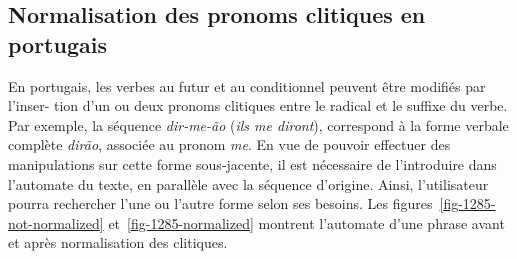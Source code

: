 \subsection{Normalisation des pronoms clitiques en portugais}
\label{section-portuguese-clitics}
En portugais, les verbes au futur et au conditionnel peuvent être modifiés par l’inser-
tion d’un ou deux pronoms clitiques entre le radical et le suffixe du verbe. Par exemple, la
séquence \textit{dir-me-ão} (\textit{ils me diront}), correspond à la forme verbale complète 
\textit{dirão}, associée au pronom \textit{me}. En vue de pouvoir effectuer des manipulations
sur cette forme sous-jacente, il est nécessaire de l’introduire dans l’automate du texte, en parallèle
avec la séquence d’origine. Ainsi, l’utilisateur pourra rechercher l’une ou l’autre forme selon ses besoins. 
Les figures~\ref{fig-1285-not-normalized} et~\ref{fig-1285-normalized} montrent l’automate d’une phrase
avant et après normalisation des clitiques.


